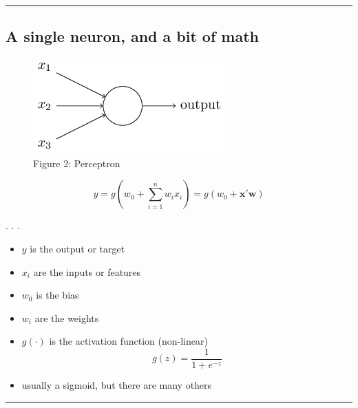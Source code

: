 \documentclass[
  letterpaper,
  DIV=11,
  numbers=noendperiod]{scrartcl}
\providecommand{\tightlist}{%
  \setlength{\itemsep}{0pt}\setlength{\parskip}{0pt}}\usepackage{longtable,booktabs,array}
\begin{document}
\begin{center}\rule{0.5\linewidth}{0.5pt}\end{center}

\hypertarget{a-single-neuron-and-a-bit-of-math}{%
\subsection{A single neuron, and a bit of
math}\label{a-single-neuron-and-a-bit-of-math}}

\begin{figure}

{\centering \includegraphics{perceptron.png}

}

\caption{Figure 2: Perceptron}

\end{figure}

\[\begin{equation}
y = g(w_0 + \sum_{i=1}^n w_i x_i) = g(w_0 + \mathbf{x}' \mathbf{w})
\end{equation}\]

. . .

\begin{itemize}
\tightlist
\item
  \(y\) is the output or target
\item
  \(x_i\) are the inputs or features
\item
  \(w_0\) is the bias
\item
  \(w_i\) are the weights
\end{itemize}

\begin{itemize}
\tightlist
\item
  \(g(\cdot)\) is the activation function (non-linear)
  \[\begin{equation}
  g(z) = \frac{1}{1 + e^{-z}}
  \end{equation}\]
\item
  usually a sigmoid, but there are many others
\end{itemize}

\begin{center}\rule{0.5\linewidth}{0.5pt}\end{center}
\end{document}
